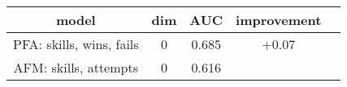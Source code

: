 \begin{tabular}{ccccc}
\toprule
                      model &  dim &             AUC & improvement\\
\midrule
 \alert{PFA: skills, wins, fails} &  \alert0 &  \alert{0.685} & \alert{+0.07} \\
 AFM: skills, attempts &  0 &  0.616 &\\ \bottomrule
\end{tabular}
